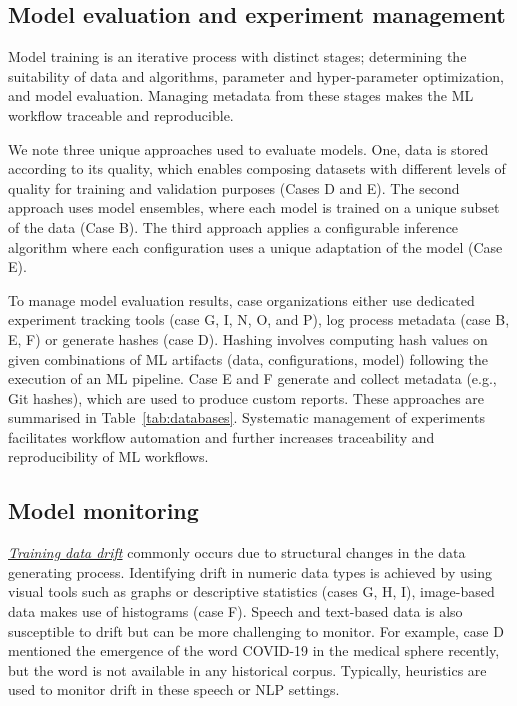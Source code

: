 \documentclass{IEEEcsmag}
\begin{document}
\subsection{Model evaluation and experiment management}
Model training is an iterative process with distinct stages; determining the suitability of data and algorithms, parameter and hyper-parameter optimization, and model evaluation. Managing metadata from these stages makes the ML workflow traceable and reproducible.

We note three unique approaches used to evaluate models. One, data is stored according to its quality, which enables composing datasets with different levels of quality for training and validation purposes (Cases D and E). The second approach uses model ensembles, where each model is trained on a unique subset of the data (Case B). The third approach applies a configurable inference algorithm where each configuration uses a unique adaptation of the model (Case E). 

To manage model evaluation results, case organizations either use dedicated experiment tracking tools (case G, I, N, O, and P), log process metadata (case B, E, F) or generate hashes (case D). Hashing involves computing hash values on given combinations of ML artifacts (data, configurations, model) following the execution of an ML pipeline. Case E and F generate and collect metadata (e.g., Git hashes), which are used to produce custom reports. These approaches are summarised in Table~\ref{tab:databases}. 
Systematic management of experiments facilitates workflow automation and further increases traceability and reproducibility of ML workflows.

 




\subsection{Model monitoring} 

\underline{\emph{Training data drift}} commonly occurs due to structural changes in the data generating process. Identifying drift in numeric data types is achieved by using visual tools such as graphs or descriptive statistics (cases G, H, I), image-based data makes use of histograms (case F). Speech and text-based data is also susceptible to drift but can be more challenging to monitor. For example, case D mentioned the emergence of the word COVID-19 in the medical sphere recently, but the word is not available in any historical corpus. Typically, heuristics are used to monitor drift in these speech or NLP settings.
\end{document}
